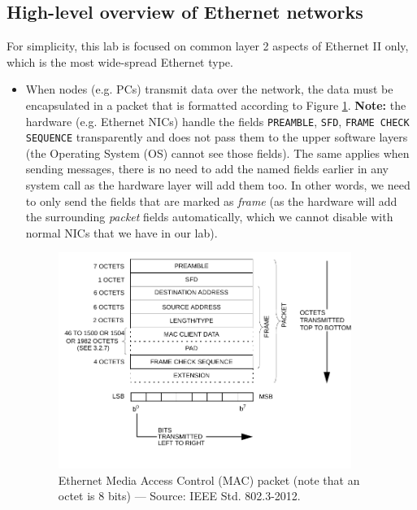 \documentclass[pdftex,12pt,a4paper]{article}
\begin{document}
        \subsection{High-level overview of Ethernet networks}
            For simplicity, this lab is focused on common layer 2 aspects of
            Ethernet II only, which is the most wide-spread Ethernet type.
            \begin{itemize}
                \item When nodes (e.g. PCs) transmit data over the network, the
                data must be encapsulated in a packet that is formatted
                according to Figure \ref{fig:macpacket}. \textbf{Note:} the
                hardware (e.g. Ethernet NICs) handle the fields
                \texttt{PREAMBLE}, \texttt{SFD}, \texttt{FRAME CHECK SEQUENCE}
                transparently and does not pass them to the upper software
                layers (the Operating System (OS) cannot see those fields). The
                same applies when sending messages, there is no need to add
                the named fields earlier in any system call as the hardware
                layer will add them too. In other words, we need to only send
                the fields that are marked as \emph{frame} (as the hardware
                will add the surrounding \emph{packet} fields automatically,
                which we cannot disable with normal NICs that we have in our
                lab).

                \begin{figure}[tbh]
                    \centering
                    \includegraphics[width=0.9\textwidth]{figures/macpacket}
                    \caption{Ethernet Media Access Control (MAC) packet (note
                    that an octet is 8 bits) --- Source: IEEE Std. 802.3-2012.}
                    \label{fig:macpacket}
                \end{figure}


\end{itemize}
\end{document}

